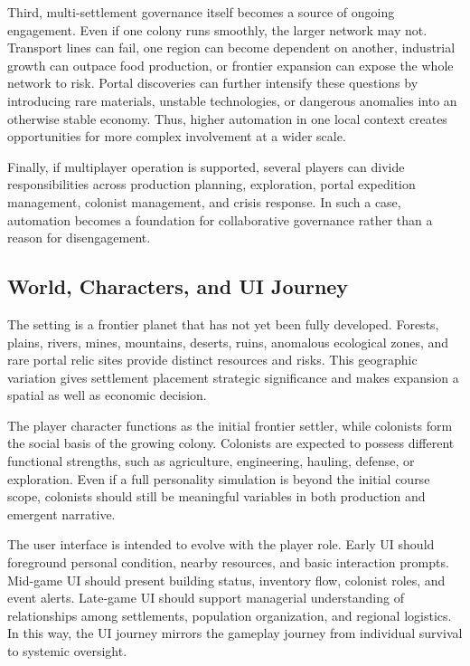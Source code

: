 \documentclass[conference]{IEEEtran}
\begin{document}
Third, multi-settlement governance itself becomes a source of ongoing engagement. Even if one colony runs smoothly, the larger network may not. Transport lines can fail, one region can become dependent on another, industrial growth can outpace food production, or frontier expansion can expose the whole network to risk. Portal discoveries can further intensify these questions by introducing rare materials, unstable technologies, or dangerous anomalies into an otherwise stable economy. Thus, higher automation in one local context creates opportunities for more complex involvement at a wider scale.

Finally, if multiplayer operation is supported, several players can divide responsibilities across production planning, exploration, portal expedition management, colonist management, and crisis response. In such a case, automation becomes a foundation for collaborative governance rather than a reason for disengagement.

\subsection{World, Characters, and UI Journey}
The setting is a frontier planet that has not yet been fully developed. Forests, plains, rivers, mines, mountains, deserts, ruins, anomalous ecological zones, and rare portal relic sites provide distinct resources and risks. This geographic variation gives settlement placement strategic significance and makes expansion a spatial as well as economic decision.

The player character functions as the initial frontier settler, while colonists form the social basis of the growing colony. Colonists are expected to possess different functional strengths, such as agriculture, engineering, hauling, defense, or exploration. Even if a full personality simulation is beyond the initial course scope, colonists should still be meaningful variables in both production and emergent narrative.

The user interface is intended to evolve with the player role. Early UI should foreground personal condition, nearby resources, and basic interaction prompts. Mid-game UI should present building status, inventory flow, colonist roles, and event alerts. Late-game UI should support managerial understanding of relationships among settlements, population organization, and regional logistics. In this way, the UI journey mirrors the gameplay journey from individual survival to systemic oversight.
\end{document}

